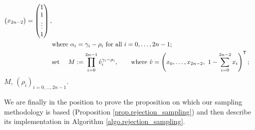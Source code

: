 \documentclass[10pt]{article}
\begin{document}
\begin{algorithm}[h]
\begin{algorithmic}
\begin{equation*}
\begin{split}
\begin{pmatrix}
   x_{2n-2}
  \end{pmatrix}
  = 
  \begin{pmatrix}
   1 \\
   1 \\
   \vdots \\
   1
  \end{pmatrix},
  \\
  & \text{where } \alpha_i = \gamma_i - \rho_i \text{ for all } i=0,\dots, 2n-1; 
  \\
  &\text{set } \quad M:= \prod_{i=0}^{2n-1} \hat{v}_{i}^{\gamma_i - \rho_i},
   \qquad \text{where }
   \hat{v} =
   \left(x_0,\dots,x_{2n-2}, \,\,  1-\sum_{i=0}^{2n-2}x_i\right)^{\mathsf{T}};
  \end{split}
  \end{equation*}
  \ENDIF
  \RETURN $M$, $(\rho_i)_{i=0,\dots,2n-1}$.
 \end{algorithmic}
\end{algorithm}

\newpage
 

We are finally in the position to prove the proposition on which our sampling methodology is based (Proposition \ref{prop.rejection_sampling}) and then describe its implementation in Algorithm \ref{algo.rejection_sampling}. 
\end{document}

